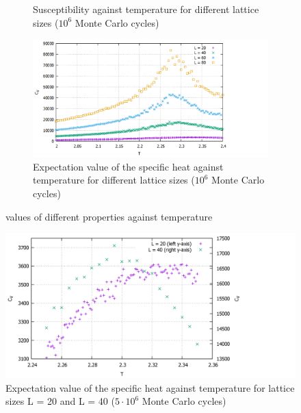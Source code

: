\documentclass[10pt,a4paper]{article}
\begin{document}
\begin{figure}[h]
\begin{subfigure}{0.45\textwidth}
	\centering
	\caption{Susceptibility against temperature for different lattice sizes ($10^6$ Monte Carlo cycles)}
	\label{chi_all}
\end{subfigure}
\begin{subfigure}{0.45\textwidth}
	\includegraphics[width=\textwidth]{cv_all.png}
	\centering
	\caption{Expectation value of the specific heat against temperature for different lattice sizes ($10^6$ Monte Carlo cycles)}
	\label{cv_all}
\end{subfigure}
\caption{values of different properties against temperature}
\end{figure}

\begin{figure}[h]
	\includegraphics[width=\textwidth]{cv2040.png}
	\centering
	\caption{Expectation value of the specific heat against temperature for lattice sizes L = 20 and L = 40 ($5 \cdot 10^6$ Monte Carlo cycles)}
	\label{cv2040}
\end{figure}
\end{document}
